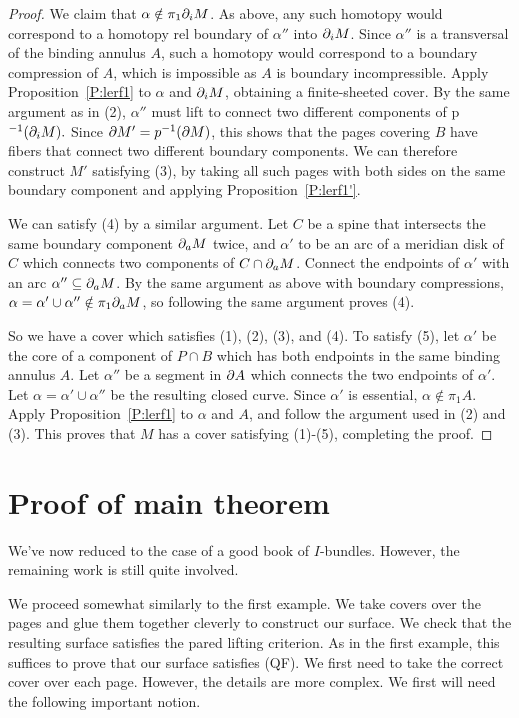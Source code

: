 \begin{proof}
We claim that $\alpha \notin \pi_1 \partial_i M$. As above, any such homotopy would
correspond to a homotopy rel boundary of $\alpha''$ into $\partial_i M$. Since
$\alpha''$ is a transversal of the binding annulus $A$, such a homotopy would
correspond to a boundary compression of $A$, which is impossible as $A$ is
boundary incompressible. Apply Proposition~\ref{P:lerf1} to $\alpha$ and $\partial_i
M$, obtaining a finite-sheeted cover. By the same argument as in (2),
$\alpha''$ must lift to connect two different components of p$^{-1}(\partial_i M).$
Since $\partial M' = p^{-1}(\partial M)$, this shows that the pages covering $B$ have
fibers that connect two different boundary components. We can therefore
construct $M'$ satisfying (3), by taking all such pages with both sides on the
same boundary component and applying Proposition~\ref{P:lerf1'}.

We can satisfy (4) by a similar argument. Let $C$ be a spine that intersects
the same boundary component $\partial_a M$ twice, and $\alpha'$ to be an arc of
a meridian disk of $C$ which connects two components of $C \cap \partial_a M$.
Connect the endpoints of $\alpha'$ with an arc $\alpha'' \subseteq \partial_a M$. By the
same argument as above with boundary compressions, $\alpha=\alpha' \cup
\alpha'' \notin \pi_1 \partial_a M$, so following the same argument proves (4).

So we have a cover which satisfies (1), (2), (3), and (4). To satisfy (5), let
$\alpha'$ be the core of a component of $P \cap B$ which has both endpoints in
the same binding annulus $A$. Let $\alpha''$ be a segment in $\partial A$ which
connects the two endpoints of $\alpha'$. Let $\alpha = \alpha' \cup \alpha''$
be the resulting closed curve. Since $\alpha'$ is essential, $\alpha \notin
\pi_1A$.  Apply Proposition~\ref{P:lerf1} to $\alpha$ and $A$, and follow the
argument used in (2) and (3).  This proves that $M$ has a cover satisfying
(1)-(5), completing the proof.

\end{proof}

\section{Proof of main theorem}

We've now reduced to the case of a good book of $I$-bundles. However, the
remaining work is still quite involved.

We proceed somewhat similarly to the first example.  We take covers over the
pages and glue them together cleverly to construct our surface.  We check that
the resulting surface satisfies the pared lifting criterion. As in the first
example, this suffices to prove that our surface satisfies (QF).  We first need
to take the correct cover over each page.  However, the details are more
complex. We first will need the following important notion.

